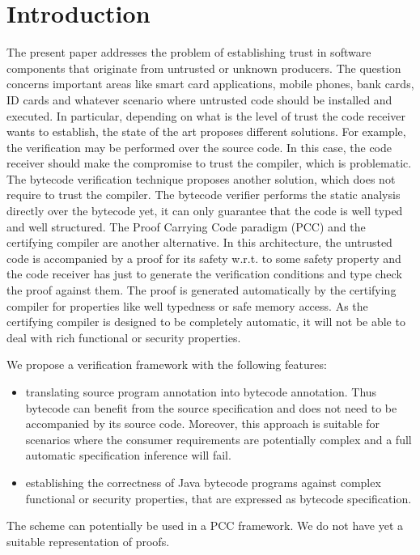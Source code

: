 
\section{Introduction}\label{intro}
The present paper addresses the  problem of establishing trust in software components that originate from untrusted or unknown producers. 
The question concerns important areas like 
smart card applications, mobile phones, bank cards, ID cards and whatever scenario where untrusted code should be installed and executed.
In particular, depending on what is the level of trust the code receiver wants to establish, 
the state of the art proposes different solutions. 
For example, the verification may be performed over the source code. 
In this case, the code receiver should make the compromise to trust the compiler, which is problematic. 
The bytecode verification technique proposes another solution, which does not require to trust the compiler. 
The bytecode verifier performs the static analysis directly over the bytecode yet, it can only guarantee that 
the code is well typed and well structured. %
The Proof Carrying Code paradigm (PCC) and the certifying compiler \cite{Necula97,ComNec,DesNecLee98} are another alternative.
 In this architecture, the untrusted code
is accompanied by a proof for its safety w.r.t. to some safety property and the code receiver has just to generate the 
verification conditions and type check the proof against them. 
The proof is generated automatically by the certifying compiler for properties like well typedness or safe memory access. 
As the certifying compiler is designed to be completely automatic, it will not be able to deal with rich functional or security properties. 
 
We propose a verification framework with the following features:
\begin{itemize}
  \item translating source program annotation into bytecode annotation.
 Thus bytecode can benefit from the source specification and does not need to be accompanied by its source code. Moreover, 
this approach is suitable for scenarios where the consumer requirements are potentially complex and a full automatic specification inference
will fail. 
   \item establishing the correctness of Java bytecode programs against complex functional or security properties, that are expressed as bytecode
specification.
\end{itemize}
The scheme can potentially be used in a PCC framework. We do not have yet a suitable representation of proofs. 

